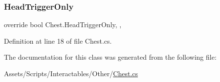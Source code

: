 \subsubsection{\texorpdfstring{Head\+Trigger\+Only}{HeadTriggerOnly}}
{\footnotesize\ttfamily override bool Chest.\+Head\+Trigger\+Only\hspace{0.3cm}{\ttfamily [get]}, {\ttfamily [set]}, {\ttfamily [protected]}}



Definition at line 18 of file Chest.\+cs.



The documentation for this class was generated from the following file\+:\begin{DoxyCompactItemize}
\item 
Assets/\+Scripts/\+Interactables/\+Other/\mbox{\hyperlink{_chest_8cs}{Chest.\+cs}}\end{DoxyCompactItemize}
